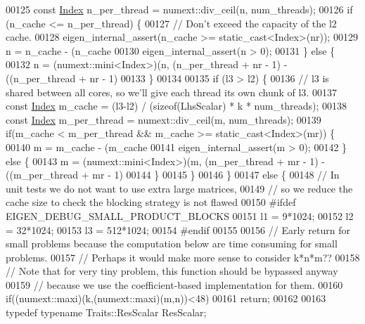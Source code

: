 \begin{DoxyCode}
00125     \textcolor{keyword}{const} \hyperlink{namespace_eigen_a62e77e0933482dafde8fe197d9a2cfde}{Index} n\_per\_thread = numext::div\_ceil(n, num\_threads);
00126     \textcolor{keywordflow}{if} (n\_cache <= n\_per\_thread) \{
00127       \textcolor{comment}{// Don't exceed the capacity of the l2 cache.}
00128       eigen\_internal\_assert(n\_cache >= static\_cast<Index>(nr));
00129       n = n\_cache - (n\_cache %
00130       eigen\_internal\_assert(n > 0);
00131     \} \textcolor{keywordflow}{else} \{
00132       n = (numext::mini<Index>)(n, (n\_per\_thread + nr - 1) - ((n\_per\_thread + nr - 1) %
00133     \}
00134 
00135     \textcolor{keywordflow}{if} (l3 > l2) \{
00136       \textcolor{comment}{// l3 is shared between all cores, so we'll give each thread its own chunk of l3.}
00137       \textcolor{keyword}{const} \hyperlink{namespace_eigen_a62e77e0933482dafde8fe197d9a2cfde}{Index} m\_cache = (l3-l2) / (\textcolor{keyword}{sizeof}(LhsScalar) * k * num\_threads);
00138       \textcolor{keyword}{const} \hyperlink{namespace_eigen_a62e77e0933482dafde8fe197d9a2cfde}{Index} m\_per\_thread = numext::div\_ceil(m, num\_threads);
00139       \textcolor{keywordflow}{if}(m\_cache < m\_per\_thread && m\_cache >= static\_cast<Index>(mr)) \{
00140         m = m\_cache - (m\_cache %
00141         eigen\_internal\_assert(m > 0);
00142       \} \textcolor{keywordflow}{else} \{
00143         m = (numext::mini<Index>)(m, (m\_per\_thread + mr - 1) - ((m\_per\_thread + mr - 1) %
00144       \}
00145     \}
00146   \}
00147   \textcolor{keywordflow}{else} \{
00148     \textcolor{comment}{// In unit tests we do not want to use extra large matrices,}
00149     \textcolor{comment}{// so we reduce the cache size to check the blocking strategy is not flawed}
00150 \textcolor{preprocessor}{#ifdef EIGEN\_DEBUG\_SMALL\_PRODUCT\_BLOCKS}
00151     l1 = 9*1024;
00152     l2 = 32*1024;
00153     l3 = 512*1024;
00154 \textcolor{preprocessor}{#endif}
00155 
00156     \textcolor{comment}{// Early return for small problems because the computation below are time consuming for small problems.}
00157     \textcolor{comment}{// Perhaps it would make more sense to consider k*n*m??}
00158     \textcolor{comment}{// Note that for very tiny problem, this function should be bypassed anyway}
00159     \textcolor{comment}{// because we use the coefficient-based implementation for them.}
00160     \textcolor{keywordflow}{if}((numext::maxi)(k,(numext::maxi)(m,n))<48)
00161       \textcolor{keywordflow}{return};
00162 
00163     \textcolor{keyword}{typedef} \textcolor{keyword}{typename} Traits::ResScalar ResScalar;

\end{DoxyCode}
